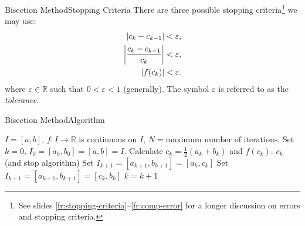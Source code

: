 \documentclass[12pt,aspectratio=169,envcountset]{beamer}
\DeclarePairedDelimiter{\abs}{\lvert}{\rvert}
\begin{document}
\begin{frame}{Bisection Method}{Stopping Criteria}
  There are three possible stopping criteria\footnote{See slides
  \ref{fr:stopping-criteria}--\ref{fr:comp-error} for a longer discussion on
  errors and stopping criteria.} we may use:
  \begin{align} 
    \abs{c_k - c_{k-1}} &< \varepsilon, \label{eq:stop-crit-abs-error} \\
    \abs*{\frac{c_k - c_{k-1}}{c_k}} &< \varepsilon,
    \label{eq:stop-crit-rel-error} \\
    \abs{f(c_k)} &< \varepsilon. \label{eq:stop-crit-func-val}
  \end{align}
  where $\varepsilon \in \mathbb{R}$ such that $0 < \varepsilon < 1$
  (generally).
  The symbol $\varepsilon$ is referred to as the \emph{tolerance}.
\end{frame}

\begin{frame}[fragile]{Bisection Method}{Algorithm}
  \footnotesize
  \begin{algorithmic}[1]
    \REQUIRE $I = [a,b]$, $f : I \to \mathbb{R}$ is continuous on $I$, $N =
    \text{maximum number of iterations}$.
    \STATE Set $k = 0$, $I_0 = [a_0,b_0] = [a,b] = I$.%
      \STATE Calculate $c_k = \frac{1}{2}(a_k + b_k)$ and $f(c_k)$.
        \RETURN $c_k$ (and stop algorithm)
      \ELSE
          \STATE Set $I_{k+1} = [a_{k+1},b_{k+1}] = [a_k,c_k]$
        \ELSE
          \STATE Set $I_{k+1} = [a_{k+1},b_{k+1}] = [c_k,b_k]$
        \ENDIF
        \STATE $k = k + 1$
      \ENDIF
    \ENDWHILE
  \end{algorithmic}
\end{frame}
\end{document}
